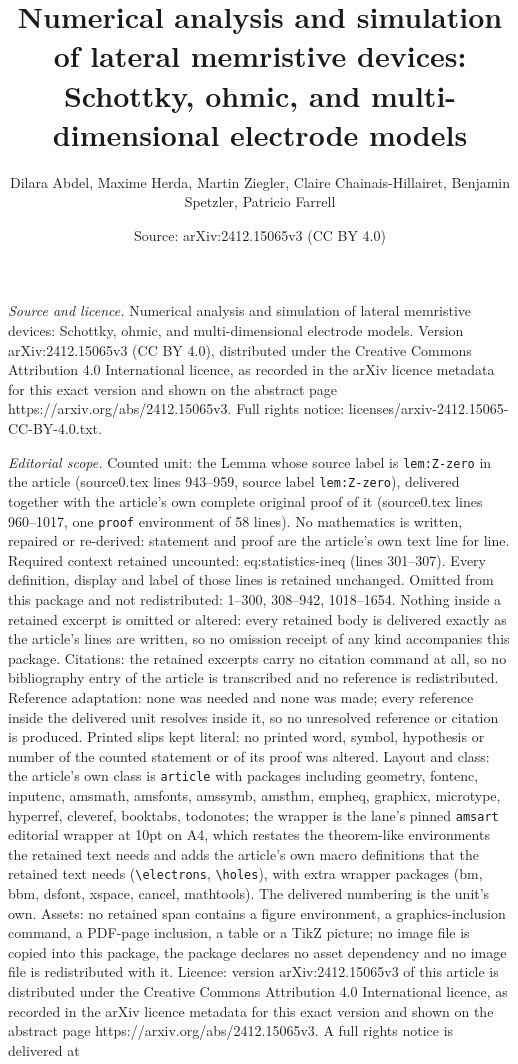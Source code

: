\documentclass[10pt,a4paper]{amsart}
\title[Numerical analysis and simulation of lateral memristive devi]{Numerical analysis and simulation of lateral memristive devices: Schottky, ohmic, and multi-dimensional electrode models}
\author{Dilara Abdel, Maxime Herda, Martin Ziegler, Claire Chainais-Hillairet, Benjamin Spetzler, Patricio Farrell}
\date{Source: arXiv:2412.15065v3 (CC BY 4.0)}
\begin{document}
\maketitle

\noindent\emph{Source and licence.} Numerical analysis and simulation of lateral memristive devices: Schottky, ohmic, and multi-dimensional electrode models. Version arXiv:2412.15065v3 (CC BY 4.0), distributed under the Creative Commons Attribution 4.0 International licence, as recorded in the arXiv licence metadata for this exact version and shown on the abstract page https://arxiv.org/abs/2412.15065v3. Full rights notice: licenses/arxiv-2412.15065-CC-BY-4.0.txt.\par\smallskip

\noindent\textit{Editorial scope.} Counted unit: the Lemma whose source label is \texttt{lem:Z-zero} in the article (source0.tex lines 943--959, source label \texttt{lem:Z-zero}), delivered together with the article's own complete original proof of it (source0.tex lines 960--1017, one \texttt{proof} environment of 58 lines). No mathematics is written, repaired or re-derived: statement and proof are the article's own text line for line. Required context retained uncounted: eq:statistics-ineq (lines 301--307). Every definition, display and label of those lines is retained unchanged. Omitted from this package and not redistributed: 1--300, 308--942, 1018--1654. Nothing inside a retained excerpt is omitted or altered: every retained body is delivered exactly as the article's lines are written, so no omission receipt of any kind accompanies this package. Citations: the retained excerpts carry no citation command at all, so no bibliography entry of the article is transcribed and no reference is redistributed. Reference adaptation: none was needed and none was made; every reference inside the delivered unit resolves inside it, so no unresolved reference or citation is produced. Printed slips kept literal: no printed word, symbol, hypothesis or number of the counted statement or of its proof was altered. Layout and class: the article's own class is \texttt{article} with packages including geometry, fontenc, inputenc, amsmath, amsfonts, amssymb, amsthm, empheq, graphicx, microtype, hyperref, cleveref, booktabs, todonotes; the wrapper is the lane's pinned \texttt{amsart} editorial wrapper at 10pt on A4, which restates the theorem-like environments the retained text needs and adds the article's own macro definitions that the retained text needs (\texttt{\textbackslash electrons}, \texttt{\textbackslash holes}), with extra wrapper packages (bm, bbm, dsfont, xspace, cancel, mathtools). The delivered numbering is the unit's own. Assets: no retained span contains a figure environment, a graphics-inclusion command, a PDF-page inclusion, a table or a TikZ picture; no image file is copied into this package, the package declares no asset dependency and no image file is redistributed with it. Licence: version arXiv:2412.15065v3 of this article is distributed under the Creative Commons Attribution 4.0 International licence, as recorded in the arXiv licence metadata for this exact version and shown on the abstract page https://arxiv.org/abs/2412.15065v3. A full rights notice is delivered at 
\end{document}
